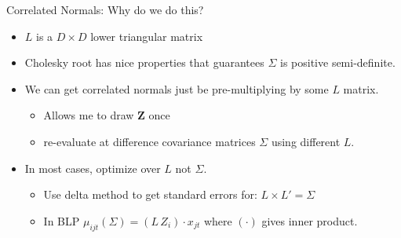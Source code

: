 \documentclass[xcolor=pdftex,dvipsnames,table,mathserif,aspectratio=169]{beamer}
\begin{document}
\begin{frame}{Correlated Normals: Why do we do this?}
\begin{itemize}
\item $L$ is a $D \times D$ \alert{lower triangular matrix}\\
\item Cholesky root has nice properties that guarantees $\Sigma$ is positive semi-definite.
\item We can get correlated normals just be pre-multiplying by some $L$ matrix.
\begin{itemize}
\item Allows me to draw $\mathbf{Z}$ once
\item  re-evaluate at difference covariance matrices $\Sigma$ using different $L$.
\end{itemize}
\item In most cases, \alert{optimize over $L$} not $\Sigma$.
\begin{itemize}
\item Use delta method to get standard errors for: $L \times L' = \Sigma$
\item In BLP $\mu_{ijt}(\Sigma) = (L \, Z_i) \cdot x_{jt} $ where $(\cdot)$ gives \alert{inner product}.
\end{itemize}
\end{itemize}

\end{frame}
\end{document}
